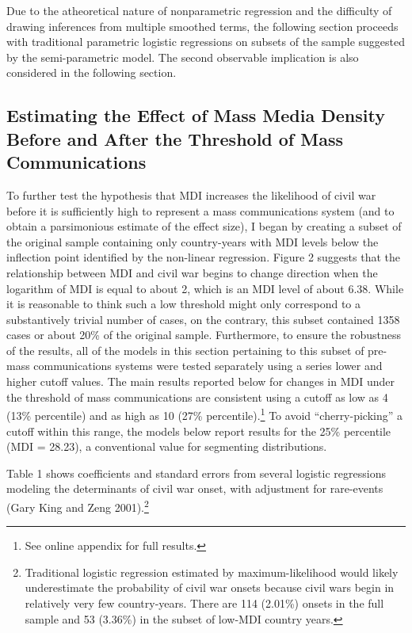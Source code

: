 \documentclass[11pt,article,oneside]{memoir}
\begin{document}
Due to the atheoretical nature of nonparametric regression and the
difficulty of drawing inferences from multiple smoothed terms, the
following section proceeds with traditional parametric logistic
regressions on subsets of the sample suggested by the semi-parametric
model. The second observable implication is also considered in the
following section.

\subsection{Estimating the Effect of Mass Media Density Before and After
the Threshold of Mass
Communications}\label{estimating-the-effect-of-mass-media-density-before-and-after-the-threshold-of-mass-communications}

To further test the hypothesis that MDI increases the likelihood of
civil war before it is sufficiently high to represent a mass
communications system (and to obtain a parsimonious estimate of the
effect size), I began by creating a subset of the original sample
containing only country-years with MDI levels below the inflection point
identified by the non-linear regression. Figure 2 suggests that the
relationship between MDI and civil war begins to change direction when
the logarithm of MDI is equal to about 2, which is an MDI level of about
6.38. While it is reasonable to think such a low threshold might only
correspond to a substantively trivial number of cases, on the contrary,
this subset contained 1358 cases or about 20\% of the original sample.
Furthermore, to ensure the robustness of the results, all of the models
in this section pertaining to this subset of pre-mass communications
systems were tested separately using a series lower and higher cutoff
values. The main results reported below for changes in MDI under the
threshold of mass communications are consistent using a cutoff as low as
4 (13\% percentile) and as high as 10 (27\% percentile).\footnote{See
  online appendix for full results.} To avoid ``cherry-picking'' a
cutoff within this range, the models below report results for the 25\%
percentile (MDI = 28.23), a conventional value for segmenting
distributions.

Table 1 shows coefficients and standard errors from several logistic
regressions modeling the determinants of civil war onset, with
adjustment for rare-events (Gary King and Zeng 2001).\footnote{Traditional
  logistic regression estimated by maximum-likelihood would likely
  underestimate the probability of civil war onsets because civil wars
  begin in relatively very few country-years. There are 114 (2.01\%)
  onsets in the full sample and 53 (3.36\%) in the subset of low-MDI
  country years.}
\end{document}
